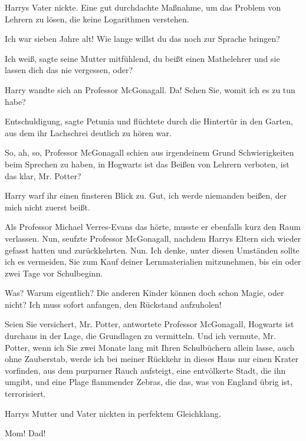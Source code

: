Harrys Vater nickte. \glqq{}Eine gut durchdachte Maßnahme, um das Problem von
Lehrern zu lösen, die keine Logarithmen verstehen.\grqq{}

\glqq{}Ich war sieben Jahre alt! Wie lange willst du das noch zur Sprache
bringen?\grqq{}

\glqq{}Ich weiß\grqq{}, sagte seine Mutter mitfühlend, \glqq{}du beißt einen
Mathelehrer und sie lassen dich das nie vergessen, oder?\grqq{}

Harry wandte sich an Professor McGonagall. \glqq{}Da! Sehen Sie, womit ich es zu
tun habe?\grqq{}

\glqq{}Entschuldigung\grqq{}, sagte Petunia und flüchtete durch die Hintertür in
den Garten, aus dem ihr Lachschrei deutlich zu hören war.

\glqq{}So, ah, so\grqq{}, Professor McGonagall schien aus irgendeinem Grund
Schwierigkeiten beim Sprechen zu haben, \glqq{}in Hogwarts ist das Beißen von
Lehrern verboten, ist das klar, Mr. Potter?\grqq{}

Harry warf ihr einen finsteren Blick zu. \glqq{}Gut, ich werde niemanden beißen,
der mich nicht zuerst beißt.\grqq{}

Als Professor Michael Verres-Evans das hörte, musste er ebenfalls kurz den Raum
verlassen. \glqq{}Nun\grqq{}, seufzte Professor McGonagall, nachdem Harrys
Eltern sich wieder gefasst hatten und zurückkehrten. \glqq{}Nun. Ich denke,
unter diesen Umständen sollte ich es vermeiden, Sie zum Kauf deiner
Lernmaterialien mitzunehmen, bis ein oder zwei Tage vor Schulbeginn.\grqq{}

\glqq{}Was? Warum eigentlich? Die anderen Kinder können doch schon Magie, oder
nicht? Ich muss sofort anfangen, den Rückstand aufzuholen!\grqq{}

\glqq{}Seien Sie versichert, Mr. Potter\grqq{}, antwortete Professor McGonagall,
\glqq{}Hogwarts ist durchaus in der Lage, die Grundlagen zu vermitteln. Und ich
vermute, Mr. Potter, wenn ich Sie zwei Monate lang mit Ihren Schulbüchern allein
lasse, auch ohne Zauberstab, werde ich bei meiner Rückkehr in dieses Haus nur
einen Krater vorfinden, aus dem purpurner Rauch aufsteigt, eine entvölkerte
Stadt, die ihn umgibt, und eine Plage flammender Zebras, die das, was von
England übrig ist, terrorisiert.\grqq{}

Harrys Mutter und Vater nickten in perfektem Gleichklang.

\glqq{}Mom! Dad!\grqq{}